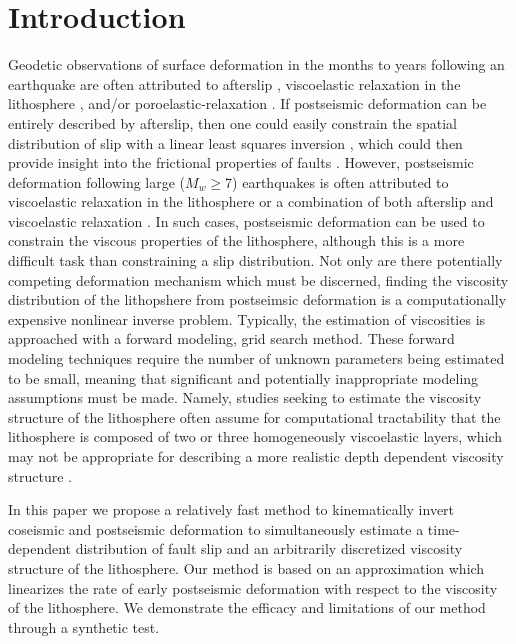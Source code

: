 \documentclass[extra]{gji}
\begin{document}
\section{Introduction}
Geodetic observations of surface deformation in the months to years
following an earthquake are often attributed to afterslip
\citep[e.g.][]{M1991}, viscoelastic relaxation in the lithosphere
\citep[e.g.][]{NM1974}, and/or poroelastic-relaxation
\citep[e.g.][]{P1998,J2003}.  If postseismic deformation can be
entirely described by afterslip, then one could easily constrain the
spatial distribution of slip with a linear least squares inversion
\citep[e.g.][]{H1987,B2002,F2007}, which could then provide insight
into the frictional properties of faults \citep[e.g.][]{H2006,B2009}.
However, postseismic deformation following large ($M_w\geq$7)
earthquakes is often attributed to viscoelastic relaxation in the
lithosphere \citep[e.g.][]{HH2003,P2003,P2005} or a combination of
both afterslip and viscoelastic relaxation
\citep[e.g.][]{F2006,H2009,J2009,R2015}.  In such cases, postseismic
deformation can be used to constrain the viscous properties of the
lithosphere, although this is a more difficult task than constraining
a slip distribution.  Not only are there potentially competing
deformation mechanism which must be discerned, finding the viscosity
distribution of the lithopshere from postseimsic deformation is a
computationally expensive nonlinear inverse problem.  Typically, the
estimation of viscosities is approached with a forward modeling, grid
search method.  These forward modeling techniques require the number
of unknown parameters being estimated to be small, meaning that
significant and potentially inappropriate modeling assumptions must be
made.  Namely, studies seeking to estimate the viscosity structure of
the lithosphere often assume for computational tractability that the
lithosphere is composed of two or three homogeneously viscoelastic
layers, which may not be appropriate for describing a more realistic
depth dependent viscosity structure \citep{RG2008,H2013}.

In this paper we propose a relatively fast method to kinematically
invert coseismic and postseismic deformation to simultaneously
estimate a time-dependent distribution of fault slip and an
arbitrarily discretized viscosity structure of the lithosphere.  Our
method is based on an approximation which linearizes the rate of early
postseismic deformation with respect to the viscosity of the
lithosphere.  We demonstrate the efficacy and limitations of our
method through a synthetic test.
\end{document}
